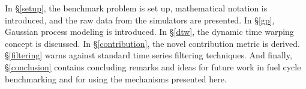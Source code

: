 In \S \ref{setup}, the benchmark problem is set up, mathematical notation is 
introduced,
and the raw data from the simulators are presented. In \S \ref{gp}, Gaussian 
process 
modeling is introduced. In \S \ref{dtw}, the dynamic time warping concept is
discussed. In \S \ref{contribution}, the novel contribution metric is 
derived.
\S \ref{filtering} warns against standard time series filtering
techniques. And finally, \S \ref{conclusion} contains concluding remarks
and ideas for future work in fuel cycle benchmarking and for 
using the mechanisms presented here.
